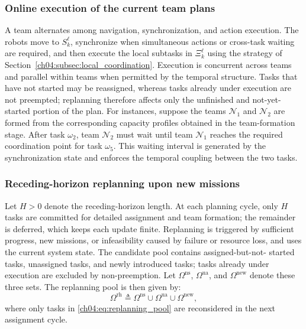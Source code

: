 \subsubsection{Online execution of the current team plans}
\label{ch04:subsubsec:online_exec_model}

A team alternates among navigation, synchronization, and action execution. The
robots move to $S_k^\ell$, synchronize when simultaneous actions or cross-task
waiting are required, and then execute the local subtasks in $\Xi_k^\ell$ using
the strategy of Section~\ref{ch04:subsec:local_coordination}. Execution is
concurrent across teams and parallel within teams when permitted by the temporal
structure. Tasks that have not started may be reassigned, whereas tasks already
under execution are not preempted; replanning therefore affects only the
unfinished and not-yet-started portion of the plan.
For instances, suppose the teams
$\mathcal{N}_1$ and $\mathcal{N}_2$ are formed from the corresponding capacity
profiles obtained in the team-formation stage. After task $\omega_2$, team
$\mathcal{N}_2$ must wait until team $\mathcal{N}_1$ reaches the required
coordination point for task $\omega_5$. This waiting interval is generated by
the synchronization state and enforces the temporal coupling between the two
tasks.

\subsubsection{Receding-horizon replanning upon new missions}
\label{ch04:subsubsec:receding_horizon_replan}

Let $H>0$ denote the receding-horizon length. At each planning cycle, only $H$
tasks are committed for detailed assignment and team formation; the remainder is
deferred, which keeps each update finite. Replanning is triggered by sufficient
progress, new missions, or infeasibility caused by failure or resource loss, and
uses the current system state. The candidate pool contains assigned-but-not-
started tasks, unassigned tasks, and newly introduced tasks; tasks already under
execution are excluded by non-preemption. Let $\Omega^{\mathrm{ns}}$,
$\Omega^{\mathrm{ua}}$, and $\Omega^{\mathrm{new}}$ denote these three sets. The
replanning pool is then given by:
\begin{equation}
\label{ch04:eq:replanning_pool}
\Omega^{\mathrm{rh}} \triangleq
\Omega^{\mathrm{ns}} \cup
\Omega^{\mathrm{ua}} \cup
\Omega^{\mathrm{new}},
\end{equation}
where only tasks in \eqref{ch04:eq:replanning_pool} are reconsidered in the
next assignment cycle.

